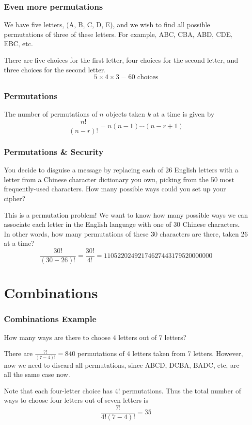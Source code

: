 \documentclass{beamer}
\newcommand{\<}{\langle}
\renewcommand{\>}{\rangle}
\begin{document}
\begin{frame}
\frametitle{Even more permutations}

We have five letters, (A, B, C, D, E), and we wish to find all possible permutations of three of these letters. For example, ABC, CBA, ABD, CDE, EBC, etc. \newline

\pause

There are five choices for the first letter, four choices for the second letter, and three choices for the second letter.
\[
5\times 4 \times 3 = 60 \text{ choices}
\]
\end{frame}


\begin{frame}
\frametitle{Permutations}

The {\color{red}number of permutations of $n$ objects taken $k$ at a time} is given by
\[
\frac{n!}{(n-r)!} = n(n-1)\cdots(n-r+1)
\]
\end{frame}

\begin{frame}
\frametitle{Permutations \& Security}

You decide to disguise a message by replacing each of 26 English letters with a letter from a Chinese character dictionary you own, picking from the 50 most frequently-used characters.  How many possible ways could you set up your cipher?\newline 

\pause

This is a permutation problem! We want to know how many possible ways we can associate each letter in the English language with one of 30 Chinese characters. In other words, how many permutations of these 30 characters are there, taken 26 at a time?
\[
\frac{30!}{(30-26)!} = \frac{30!}{4!} = 11052202492174627443179520000000
\]
\end{frame}

\section{Combinations} 

\begin{frame}
\frametitle{Combinations Example}

How many ways are there to choose 4 letters out of 7 letters? \newline

\pause

There are $\frac{7!}{(7-4)!} = 840$ permutations of 4 letters taken from 7 letters. However, now we need to discard all permutations, since ABCD, DCBA, BADC, etc, are all the same case now. \newline

\pause

Note that each four-letter choice has $4!$ permutations. Thus the total number of ways to choose four letters out of seven letters is 
\[
\frac{7!}{4!(7-4)!} = 35
\]
\end{frame}
\end{document}
